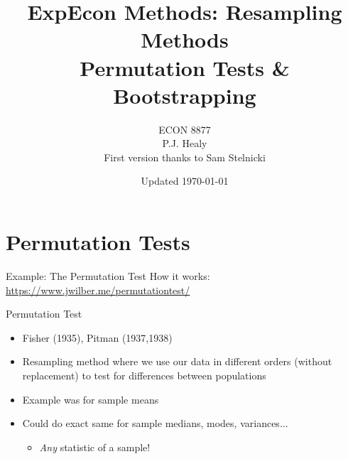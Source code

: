 

\title[Bootstrapping]{ExpEcon Methods: Resampling Methods\\
Permutation Tests \& Bootstrapping}
\author[ECON 8877]{ECON 8877\\P.J. Healy\\First version thanks to Sam Stelnicki} \color{metrop}
\institute[OSU]{}
\date[]{\vfill {\tiny Updated \today}}



\begin{frame}
    \maketitle
\end{frame}


\section{Permutation Tests}

\begin{frame}{Example: The Permutation Test}
How it works:
\br
    \url{https://www.jwilber.me/permutationtest/}
\end{frame}

\begin{frame}{Permutation Test}
    \begin{itemize}
        \item Fisher (1935), Pitman (1937,1938)
        \item Resampling method where we use our data in different orders (without replacement) to test for differences between populations
        \item Example was for sample means
        \item Could do exact same for sample medians, modes, variances...
        \begin{itemize}
            \item \textit{Any} statistic of a sample!
        \end{itemize}
    \end{itemize}
\end{frame}

